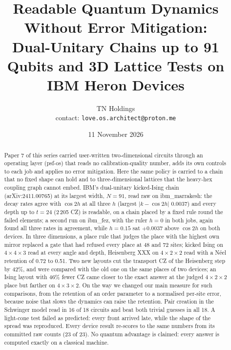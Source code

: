 \documentclass[10pt,a4paper]{article}
\title{Readable Quantum Dynamics Without Error Mitigation:\\ Dual-Unitary Chains up to 91 Qubits and 3D Lattice Tests
on IBM Heron Devices}
\author{TN Holdings\\ \small contact: \texttt{love.os.architect@proton.me}}
\date{11 November 2026}
\begin{document}
\maketitle

\begin{abstract}
Paper 7 of this series carried user-written two-dimensional circuits through an operating layer (psf-os) that reads
no calibration-quality number, adds its own controls to each job and applies no error mitigation. Here the same
policy is carried to a chain that no fixed shape can hold and to three-dimensional lattices that the heavy-hex
coupling graph cannot embed. IBM's dual-unitary kicked-Ising chain (arXiv:2411.00765) at its largest width,
$N = 91$, read raw on ibm\_marrakesh: the decay rates agree with $\cos 2h$ at all three $h$ (largest
$|k - \cos 2h|$ 0.0037) and every depth up to $t = 24$ (2\,205 CZ) is readable, on a chain placed by a fixed rule
round the failed elements; a second run on ibm\_fez, with the ruler $h = 0$ in both jobs, again found all three
rates in agreement, while $h = 0.15$ sat $+0.0037$ above $\cos 2h$ on both devices. In three dimensions, a place
rule that judges the place with the highest own mirror replaced a gate that had refused every place at 48 and 72
sites; kicked Ising on $4\times4\times3$ read at every angle and depth, Heisenberg XXX on $4\times2\times2$ read
with a N\'eel retention of 0.72 to 0.51. Two new layouts cut the transport CZ of the Heisenberg step by 42\%, and
were compared with the old one on the same places of two devices; an Ising layout with 46\% fewer CZ came closer to
the exact answer at the judged $4\times2\times2$ place but farther on $4\times3\times2$. On the way we changed our main measure for such
comparisons, from the retention of an order parameter to a normalised per-site error, because noise that slows the
dynamics can raise the retention. Pair creation in the Schwinger model read in 16 of 18 circuits and beat both
trivial guesses in all 18. A light-cone test failed as predicted: every front arrived late, while the shape of the
spread was reproduced. Every device result re-scores to the same numbers from its committed raw counts (23 of 23).
No quantum advantage is claimed: every answer is computed exactly on a classical machine.
\end{abstract}
\end{document}
